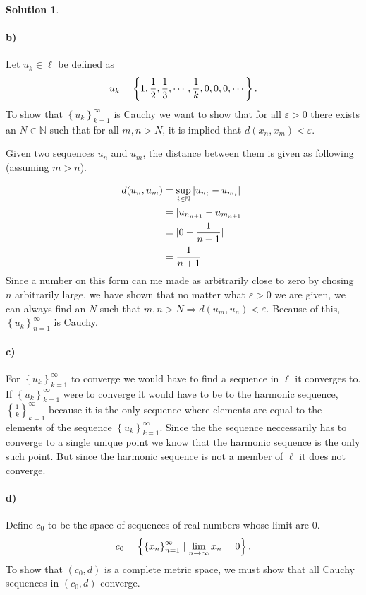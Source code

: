 \documentclass[a4paper]{article}
\theoremstyle{definition}
\newtheorem{sol}{Solution}
\begin{document}
\begin{sol}
\paragraph{b)}
Let $u_k \in \ell$ be defined as
\begin{equation}
  \notag
  u_k = \left\{ 1, \frac{1}{2}, \frac{1}{3}, \cdots, \frac{1}{k}, 0, 0, 0, \cdots \right\}.
\end{equation}
To show that $\left\{ u_k \right\}_{ k = 1 }^{\infty}$ is Cauchy we want to
show that for all $\varepsilon > 0$ there exists an $N \in \mathbb{N}$ such
that for all $m, n > N$, it is implied that $d\left( x_n, x_m \right) <
\varepsilon$.

Given two sequences $u_n$ and $u_m$, the distance between them is given as
following (assuming $m > n$).

\begin{align*}
  \notag
  d(u_n, u_m) &= \sup_{i\in\mathbb{N}}\left| u_{n_{i}} - u_{m_{i}} \right| \\ 
              &= | u_{n_{n+1}} - u_{m_{n+1}} | \\
              &= | 0 - \frac{1}{n+1} |\\
              &= \frac{1}{n+1}
\end{align*}
Since a number on this form can me made as arbitrarily close to zero by chosing
$n$ arbitrarily large, we have shown that no matter what $\varepsilon > 0$ we
are given, we can always find an $N$ such that $m, n > N \Longrightarrow d(u_m,
u_n) < \varepsilon$. Because of this, $\left\{ u_k \right\}_{n=1}^{\infty}$ is
Cauchy.

\paragraph{c)}

For $\left\{ u_k \right\}_{k=1}^{\infty}$ to converge we would have to find a
sequence in $\ell$ it converges to. If $\left\{ u_k \right\}_{k=1}^{\infty}$
were to converge it would have to be to the harmonic sequence, $\left\{
\frac{1}{k} \right\}_{k=1}^{\infty}$ because it is the only sequence where
elements are equal to the elements of the sequence $\left\{ u_k
\right\}_{k=1}^{\infty}$. Since the the sequence neccessarily has to converge
to a single unique point we know that the harmonic sequence is the only such
point. But since the harmonic sequence is not a member of $\ell$ it does not
converge.

\paragraph{d)}
Define $c_0$ to be the space of sequences of real numbers whose limit are 0.
\begin{equation}
  \notag
  c_{0} = \left\{ \left\{ x_n \right\}_{n=1}^{\infty} \mid \lim\limits_{n\rightarrow\infty} x_n = 0 \right\}.
\end{equation}
To show that $\left( c_0, d \right)$ is a complete metric space, we must show
that all Cauchy sequences in $\left( c_0, d \right)$ converge.


\end{sol}
\end{document}
